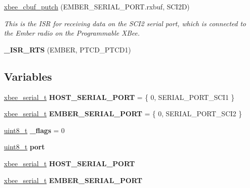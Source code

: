 \begin{DoxyCompactItemize}
\hyperlink{group__hal__hcs08_gac4c834cc0ad3ee43af562f658833a6d5}{xbee\+\_\+cbuf\+\_\+putch} (E\+M\+B\+E\+R\+\_\+\+S\+E\+R\+I\+A\+L\+\_\+\+P\+O\+R\+T.\+rxbuf, S\+C\+I2D)
\begin{DoxyCompactList}\small\item\em This is the I\+SR for receiving data on the S\+C\+I2 serial port, which is connected to the Ember radio on the Programmable X\+Bee. \end{DoxyCompactList}\item 
\mbox{\label{group__hal__hcs08_ga24980a5b377ce3ec80b1a5b59b93c894}} 
{\bfseries \+\_\+\+I\+S\+R\+\_\+\+R\+TS} (E\+M\+B\+ER, P\+T\+C\+D\+\_\+\+P\+T\+C\+D1)
\end{DoxyCompactItemize}
\subsection*{Variables}
\begin{DoxyCompactItemize}
\item 
\mbox{\label{group__hal__hcs08_ga7b94b1cffbda721cef09c47910312334}} 
\hyperlink{structxbee__serial__t}{xbee\+\_\+serial\+\_\+t} {\bfseries H\+O\+S\+T\+\_\+\+S\+E\+R\+I\+A\+L\+\_\+\+P\+O\+RT} = \{ 0, S\+E\+R\+I\+A\+L\+\_\+\+P\+O\+R\+T\+\_\+\+S\+C\+I1 \}
\item 
\mbox{\label{group__hal__hcs08_gabde5add8d0a8b02079f3bcfd077a6040}} 
\hyperlink{structxbee__serial__t}{xbee\+\_\+serial\+\_\+t} {\bfseries E\+M\+B\+E\+R\+\_\+\+S\+E\+R\+I\+A\+L\+\_\+\+P\+O\+RT} = \{ 0, S\+E\+R\+I\+A\+L\+\_\+\+P\+O\+R\+T\+\_\+\+S\+C\+I2 \}
\item 
\mbox{\label{group__hal__hcs08_ga5629227e4392e5086f50519e78e4c973}} 
\hyperlink{group__hal__dos_gae1affc9ca37cfb624959c866a73f83c2}{uint8\+\_\+t} {\bfseries \+\_\+flags} = 0
\item 
\mbox{\label{group__hal__hcs08_ga2fa54f9024782843172506fadbee2ac8}} 
\hyperlink{group__hal__dos_gae1affc9ca37cfb624959c866a73f83c2}{uint8\+\_\+t} {\bfseries port}
\item 
\mbox{\label{group__hal__hcs08_ga7b94b1cffbda721cef09c47910312334}} 
\hyperlink{structxbee__serial__t}{xbee\+\_\+serial\+\_\+t} {\bfseries H\+O\+S\+T\+\_\+\+S\+E\+R\+I\+A\+L\+\_\+\+P\+O\+RT}
\item 
\mbox{\label{group__hal__hcs08_gabde5add8d0a8b02079f3bcfd077a6040}} 
\hyperlink{structxbee__serial__t}{xbee\+\_\+serial\+\_\+t} {\bfseries E\+M\+B\+E\+R\+\_\+\+S\+E\+R\+I\+A\+L\+\_\+\+P\+O\+RT}
\end{DoxyCompactItemize}


